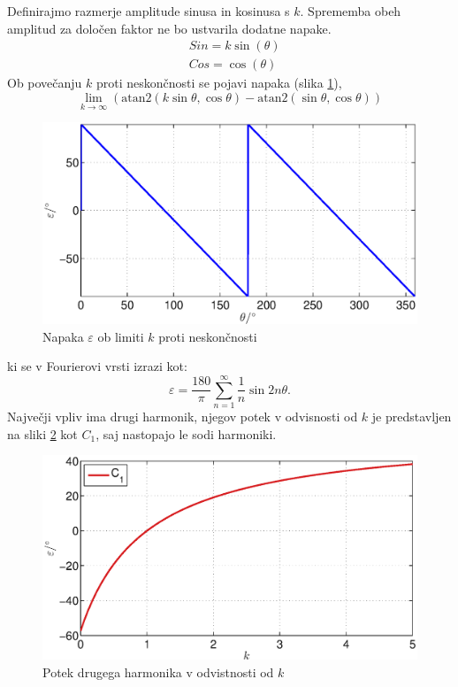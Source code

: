 \documentclass[a4paper]{article}
\begin{document}
Definirajmo razmerje amplitude sinusa in kosinusa s $k$. Sprememba obeh amplitud za določen faktor ne bo ustvarila dodatne napake.
	\begin{eqnarray}
	\label{equ:def_sin_ama}
	&Sin = k \sin(\theta)\\
	\label{equ:def_cos_amp}
	&Cos =\cos(\theta)
	\end{eqnarray}
Ob povečanju $k$ proti neskončnosti se pojavi napaka (slika \ref{fig:lim_amp}),
\begin{equation}
\label{equ:amp_lim}
\lim_{k \rightarrow \infty} (\mathrm{atan2}(k \sin{\theta},\cos{\theta})-\mathrm{atan2}(\sin{\theta},\cos{\theta}))
\end{equation}
\begin{figure}[!htb]
	\begin{center}
		\includegraphics[width=\linewidth]{./Slike/lim_amp.eps}
		\caption{Napaka $\varepsilon$ ob limiti $k$ proti neskončnosti} \label{fig:lim_amp}
	\end{center}
\end{figure}

ki se v Fourierovi vrsti izrazi kot:
\begin{equation}
\label{equ:lim_amp_vrsta}
\varepsilon = \frac{180}{\pi}\sum_{n=1}^{\infty}\frac{1}{n} \sin 2 n \theta.
\end{equation}
Največji vpliv ima drugi harmonik, njegov potek v odvisnosti od $k$ je predstavljen na sliki \ref{fig:amp} kot $C_1$, saj nastopajo le sodi harmoniki.
\begin{figure}[!htb]
	\begin{center}
		\includegraphics[width=\linewidth]{./Slike/amp.eps}
		\caption{Potek drugega harmonika v odvistnosti od $k$} \label{fig:amp}
	\end{center}
\end{figure}
\end{document}
